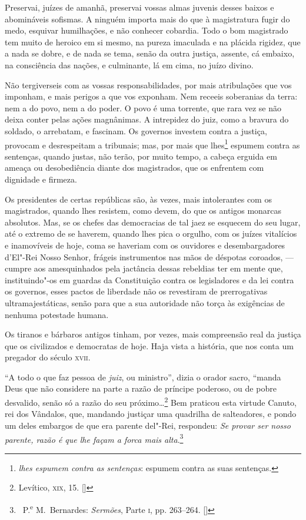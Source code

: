 Preservai, juízes de amanhã, preservai vossas almas juvenis desses
baixos e abomináveis sofismas. A ninguém importa mais do que à
magistratura fugir do medo, esquivar humilhações, e não conhecer
cobardia. Todo o bom magistrado tem muito de heroico em si mesmo, na
pureza imaculada e na plácida rigidez, que a nada se dobre, e de nada
se tema, senão da outra justiça, assente, cá embaixo, na consciência
das nações, e culminante, lá em cima, no juízo divino.

Não tergiverseis com as vossas responsabilidades, por mais
atribulações que vos imponham, e mais perigos a que vos exponham. Nem
receeis soberanias da terra: nem a do povo, nem a do poder. O povo é
uma torrente, que rara vez se não deixa conter pelas ações magnânimas.
A intrepidez do juiz, como a bravura do soldado, o arrebatam, e
fascinam. Os governos investem contra a justiça, provocam e
desrespeitam a tribunais; mas, por mais que lhes\footnote{ \textit{lhes
espumem contra as sentenças}: espumem contra as suas sentenças.}
espumem contra as sentenças, quando justas, não terão, por muito tempo,
a cabeça erguida em ameaça ou desobediência diante dos magistrados, que
os enfrentem com dignidade e firmeza.

Os presidentes de certas repúblicas são, às vezes, mais
intolerantes com os magistrados, quando lhes resistem, como devem, do
que os antigos monarcas absolutos. Mas, se os chefes das democracias de
tal jaez se esquecem do seu lugar, até o extremo de se haverem, quando
lhes pica o orgulho, com os juízes vitalícios e inamovíveis de hoje,
coma se haveriam com os ouvidores e desembargadores
d'El"-Rei Nosso Senhor, frágeis instrumentos nas mãos
de déspotas coroados, --- cumpre aos amesquinhados pela jactância dessas
rebeldias ter em mente que, instituindo"-os em guardas da Constituição
contra os legisladores e da lei contra os governos, esses pactos de
liberdade não os revestiram de prerrogativas ultramajestáticas, senão
para que a sua autoridade não torça às exigências de nenhuma potestade
humana.

Os tiranos e bárbaros antigos tinham, por vezes, mais compreensão
real da justiça que os civilizados e democratas de hoje. Haja vista a
história, que nos conta um pregador do século \textsc{xvii}.

``A todo o que faz pessoa de \textit{juiz}, ou
ministro'', dizia o orador sacro, ``manda
Deus que não considere na parte a razão de príncipe poderoso, ou de
pobre desvalido, senão só a razão do seu próximo\ldots{}\footnote{ Levítico,
\textsc{xix}, 15. []} Bem praticou esta virtude Canuto, rei dos Vândalos, que, mandando
justiçar uma quadrilha de salteadores, e pondo um deles embargos de que
era parente del"-Rei, respondeu: \textit{Se provar ser nosso parente,
razão é que lhe façam a forca mais alta}.\footnote{\ P.\textsuperscript{e} 
M.~Bernardes: \textit{Sermões}, Parte \textsc{i}, pp. 263--264. []}

